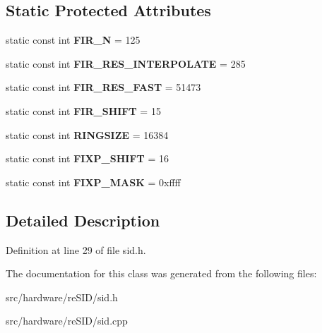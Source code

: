 \subsection*{Static Protected Attributes}
\begin{DoxyCompactItemize}
\item 
\hypertarget{classSID2_ac48aa6877a1a3ee928397ebe685c2f50}{static const int {\bfseries F\-I\-R\-\_\-\-N} = 125}\label{classSID2_ac48aa6877a1a3ee928397ebe685c2f50}

\item 
\hypertarget{classSID2_a0c3c971513ed0b33436e0adaed32b54f}{static const int {\bfseries F\-I\-R\-\_\-\-R\-E\-S\-\_\-\-I\-N\-T\-E\-R\-P\-O\-L\-A\-T\-E} = 285}\label{classSID2_a0c3c971513ed0b33436e0adaed32b54f}

\item 
\hypertarget{classSID2_a248bb86b9487a738687e90c55091f715}{static const int {\bfseries F\-I\-R\-\_\-\-R\-E\-S\-\_\-\-F\-A\-S\-T} = 51473}\label{classSID2_a248bb86b9487a738687e90c55091f715}

\item 
\hypertarget{classSID2_a8b579162b34951b5654ea56e590a22e1}{static const int {\bfseries F\-I\-R\-\_\-\-S\-H\-I\-F\-T} = 15}\label{classSID2_a8b579162b34951b5654ea56e590a22e1}

\item 
\hypertarget{classSID2_a89682f202022f4ec66aaac706cbe3be0}{static const int {\bfseries R\-I\-N\-G\-S\-I\-Z\-E} = 16384}\label{classSID2_a89682f202022f4ec66aaac706cbe3be0}

\item 
\hypertarget{classSID2_a54d2eef9f97aa439c23fbb5a3c32bc13}{static const int {\bfseries F\-I\-X\-P\-\_\-\-S\-H\-I\-F\-T} = 16}\label{classSID2_a54d2eef9f97aa439c23fbb5a3c32bc13}

\item 
\hypertarget{classSID2_ab91d7f038344e7905476f70c607f02e2}{static const int {\bfseries F\-I\-X\-P\-\_\-\-M\-A\-S\-K} = 0xffff}\label{classSID2_ab91d7f038344e7905476f70c607f02e2}

\end{DoxyCompactItemize}


\subsection{Detailed Description}


Definition at line 29 of file sid.\-h.



The documentation for this class was generated from the following files\-:\begin{DoxyCompactItemize}
\item 
src/hardware/re\-S\-I\-D/sid.\-h\item 
src/hardware/re\-S\-I\-D/sid.\-cpp\end{DoxyCompactItemize}
